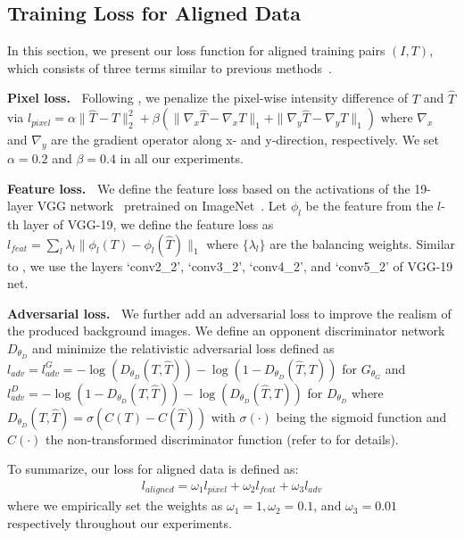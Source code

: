 \documentclass[10pt,twocolumn,letterpaper]{article}
\begin{document}
\subsection{Training Loss for Aligned Data}




In this section, we present our loss function for aligned training pairs $(I,T)$, which consists of three terms similar to previous methods~\cite{zhang2018single,eccv18refrmv}.

\vspace{5pt}
\noindent\textbf{Pixel loss.~}
Following \cite{fan2017generic}, we penalize the pixel-wise intensity difference of $T$ and $\hat{T}$ via $l_{pixel}=\alpha \|\hat{T}-T\|^2_2 + \beta (\|\nabla_x \hat{T}-\nabla_x T\|_1 + \|\nabla_y \hat{T}-\nabla_y T\|_1)$
where $\nabla_x$ and $\nabla_y$ are the gradient operator along x- and y-direction, respectively. We set $\alpha=0.2$ and $\beta=0.4$ in all our experiments.

\vspace{5pt}
\noindent\textbf{Feature loss.~} 
We define the feature loss based on the activations of the 19-layer VGG network~\cite{simonyan2014very} pretrained on ImageNet~\cite{russakovsky2015imagenet}. Let $\phi_l$ be the feature from the $l$-th layer of VGG-19, we define the feature loss as $l_{feat} = \sum_l \lambda_l \| \phi_l (T) - \phi_l (\hat{T}) \|_1$
where $\{ \lambda_l \}$ are the balancing weights. Similar to \cite{zhang2018single}, we use the layers `conv2\_2', `conv3\_2', `conv4\_2', and  `conv5\_2' of VGG-19 net.



\vspace{6pt}
\noindent\textbf{Adversarial loss.~}
We further add an adversarial loss to improve the realism of the produced background images. We define an opponent discriminator network $D_{\theta_D}$ and minimize the relativistic adversarial loss \cite{jolicoeurmartineau2018the} defined as $l_{adv} = l^{G}_{adv} = - \log (D_{\theta_D} (T, \hat{T}))  
- \log (1 - D_{\theta_D} (\hat{T}, T))$ for $G_{\theta_G}$ and $l^{D}_{adv} = - \log (1 - D_{\theta_D} (T,  \hat{T})) - \log (D_{\theta_D} (\hat{T}, T))$ for $D_{\theta_D}$ where $D_{\theta_D} (T, \hat{T}) =\sigma (C(T) - C(\hat{T}))$ with  $\sigma(\cdot)$ being the sigmoid function and $C(\cdot) $ the non-transformed discriminator function (refer to \cite{jolicoeurmartineau2018the} for details). 





To summarize, our loss for aligned data is defined as:
\begin{align}
l_{aligned} = \omega_1 l_{pixel} + \omega_2 l_{feat}  + \omega_3 l_{adv}
\label{eq:alignedLoss}
\end{align} 
where we empirically set the weights as $\omega_1 = 1, \omega_2 = 0.1$, and $\omega_3 = 0.01$ respectively throughout our experiments.
\end{document}
